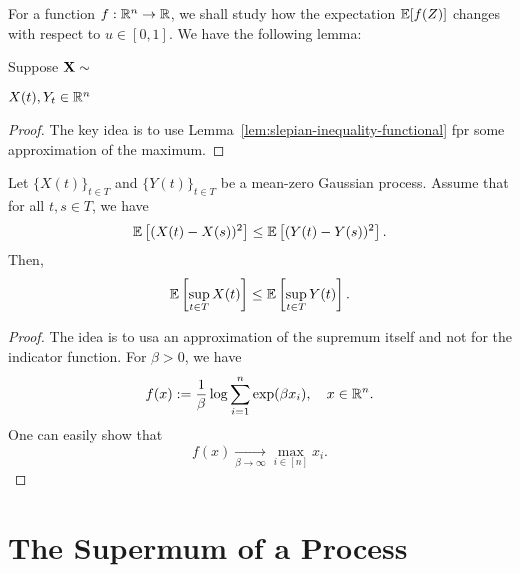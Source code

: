For a function \(f:{\mathbb R}^{n}\to{\mathbb R}\), we shall study how the expectation \({\mathbb E}[f(Z)]\) changes with respect to \(u\in[0,1]\). We have the following lemma:
\begin{lemma}
    Suppose \({\bf X}\sim\)
\end{lemma}

\begin{lemma}
    \label{lem:slepian-inequality-functional}
    
\end{lemma}



\(X(t),Y_{t}\in{\mathbb R}^{n}\)

\begin{proof}
    The key idea is to use Lemma~\ref{lem:slepian-inequality-functional} fpr some approximation of the maximum.
\end{proof}

\begin{theorem}
    Let \(\{X(t)\}_{t\in T}\) and \(\{Y(t)\}_{t\in T}\) be a mean-zero Gaussian process. Assume that for all \(t,s\in T\), we have
    \begin{equation*}
        {\mathbb E}\left[(X(t)-X(s))^{2}\right]\leq{\mathbb E}\left[(Y(t)-Y(s))^{2}\right].
    \end{equation*}
    Then,
    \begin{equation*}
        {\mathbb E}\left[\sup_{t\in T}X(t)\right]\leq{\mathbb E}\left[\sup_{t\in T}Y(t)\right].
    \end{equation*}
\end{theorem}

\begin{proof}
    The idea is to usa an approximation of the supremum itself and not for the indicator function. For \(\beta>0\), we have
    \begin{equation*}
        f(x):=\frac{1}{\beta}\log\sum_{i=1}^{n}\exp(\beta x_{i}),\quad x\in{\mathbb R}^{n}.
    \end{equation*}
    One can easily show that 
    \begin{equation*}
        f(x)\underset{\beta\to\infty}{\longrightarrow}\max_{i\in[n]}x_{i}.
    \end{equation*}
\end{proof}

\section{The Supermum of a Process}

